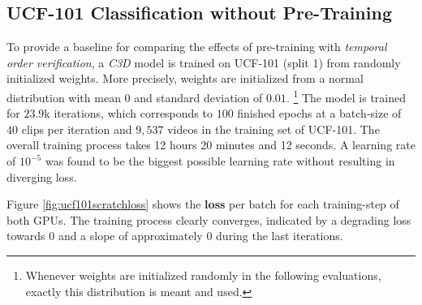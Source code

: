 \subsection{UCF-101 Classification without Pre-Training}
To provide a baseline for comparing the effects of pre-training with \textit{temporal order verification}, a \textit{C3D} model is trained on UCF-101 (split 1) from randomly initialized weights.
More precisely, weights are initialized from a normal distribution with mean $0$ and standard deviation of $0.01$.
\footnote{Whenever weights are initialized randomly in the following evaluations, exactly this distribution is meant and used.}
The model is trained for $23.9$k iterations, which corresponds to $100$ finished epochs at a batch-size of $40$ clips per iteration and $9,537$ videos in the training set of UCF-101.
The overall training process takes 12 hours 20 minutes and 12 seconds.
A learning rate of $10^{-5}$ was found to be the biggest possible learning rate without resulting in diverging loss.

Figure \ref{fig:ucf101scratchloss} shows the \textbf{loss} per batch for each training-step of both GPUs.
The training process clearly converges, indicated by a degrading loss towards 0 and a slope of approximately $0$ during the last iterations.

